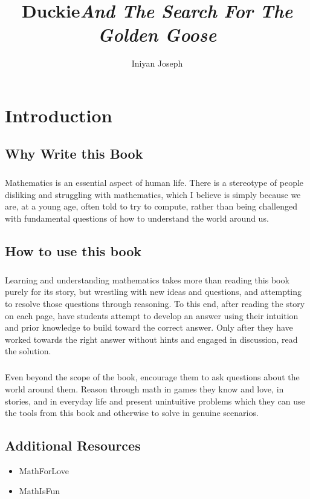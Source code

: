 \documentclass[a4paper,11pt,standalone]{book}
\title{\textbf{Duckie}\linebreak \textit{And The Search For The Golden Goose}}
\date{}
\author{Iniyan Joseph}
\begin{document}
\maketitle
\chapter*{Introduction}     
\section*{Why Write this Book}

\paragraph*{} Mathematics is an essential aspect of human life. There is a stereotype of people disliking and struggling with mathematics, which I believe is simply because we are, at a young age, often told to try to compute, rather than being challenged with fundamental questions of how to understand the world around us. 
\section*{How to use this book}
\paragraph*{} Learning and understanding mathematics takes more than reading this book purely for its story, but wrestling with new ideas and questions, and attempting to resolve those questions through reasoning. To this end, after reading the story on each page, have students attempt to develop an answer using their intuition and prior knowledge to build toward the correct answer. Only after they have worked towards the right answer without hints and engaged in discussion, read the solution.
\paragraph{} Even beyond the scope of the book, encourage them to ask questions about the world around them. Reason through math in games they know and love, in stories, and in everyday life and present unintuitive problems which they can use the tools from this book and otherwise to solve in genuine scenarios. 
\section*{Additional Resources} 
\begin{itemize}
\item MathForLove
\item MathIsFun
\end{itemize}
\tableofcontents
\vfill
\pagebreak
\end{document}
